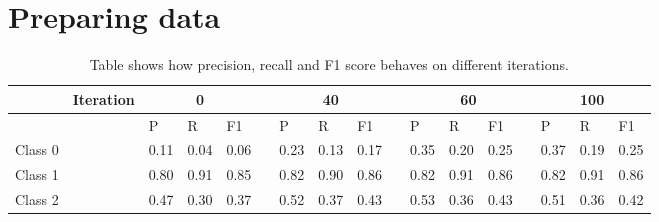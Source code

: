 \documentclass[10pt, a4paper]{article}
\begin{document}
	\section{Preparing data}
	\begin{table}[t!]
		\centering
		\caption{Table shows how precision, recall and F1 score behaves on different iterations.}
		\label{tbl:Scores}
		\begin{tabular}{lllllllllllllllll}
			\hline
			& Iteration             & \multicolumn{3}{c}{0}                                                             &                       & \multicolumn{3}{c}{40}                                                            &                       & \multicolumn{4}{c}{60}                                                                                    & \multicolumn{3}{c}{100} \\ \hline
			\multicolumn{1}{l}{}  & \multicolumn{1}{l}{} & \multicolumn{1}{l}{P}    & \multicolumn{1}{l}{R}    & \multicolumn{1}{l}{F1}   & \multicolumn{1}{l}{} & \multicolumn{1}{l}{P}    & \multicolumn{1}{l}{R}    & \multicolumn{1}{l}{F1}   & \multicolumn{1}{l}{} & \multicolumn{1}{l}{P}    & \multicolumn{1}{l}{R}    & \multicolumn{1}{l}{F1}   & \multicolumn{1}{l}{} & P      & R      & F1     \\ \hline
			\multicolumn{1}{l}{Class 0} & \multicolumn{1}{l}{} & \multicolumn{1}{l}{0.11} & \multicolumn{1}{l}{0.04} & \multicolumn{1}{l}{0.06} & \multicolumn{1}{l}{} & \multicolumn{1}{l}{0.23} & \multicolumn{1}{l}{0.13} & \multicolumn{1}{l}{0.17} & \multicolumn{1}{l}{} & \multicolumn{1}{l}{0.35} & \multicolumn{1}{l}{0.20} & \multicolumn{1}{l}{0.25} & \multicolumn{1}{l}{} & 0.37   & 0.19   & 0.25   \\ \hline
			\multicolumn{1}{l}{Class 1} & \multicolumn{1}{l}{} & \multicolumn{1}{l}{0.80} & \multicolumn{1}{l}{0.91} & \multicolumn{1}{l}{0.85} & \multicolumn{1}{l}{} & \multicolumn{1}{l}{0.82} & \multicolumn{1}{l}{0.90} & \multicolumn{1}{l}{0.86} & \multicolumn{1}{l}{} & \multicolumn{1}{l}{0.82} & \multicolumn{1}{l}{0.91} & \multicolumn{1}{l}{0.86} & \multicolumn{1}{l}{} & 0.82   & 0.91   & 0.86   \\ \hline
			\multicolumn{1}{l}{Class 2} & \multicolumn{1}{l}{} & \multicolumn{1}{l}{0.47} & \multicolumn{1}{l}{0.30} & \multicolumn{1}{l}{0.37} & \multicolumn{1}{l}{} & \multicolumn{1}{l}{0.52} & \multicolumn{1}{l}{0.37} & \multicolumn{1}{l}{0.43} & \multicolumn{1}{l}{} & \multicolumn{1}{l}{0.53} & \multicolumn{1}{l}{0.36} & \multicolumn{1}{l}{0.43} & \multicolumn{1}{l}{} & 0.51   & 0.36   & 0.42   \\ \hline
		\end{tabular}
	\end{table}
\end{document}
